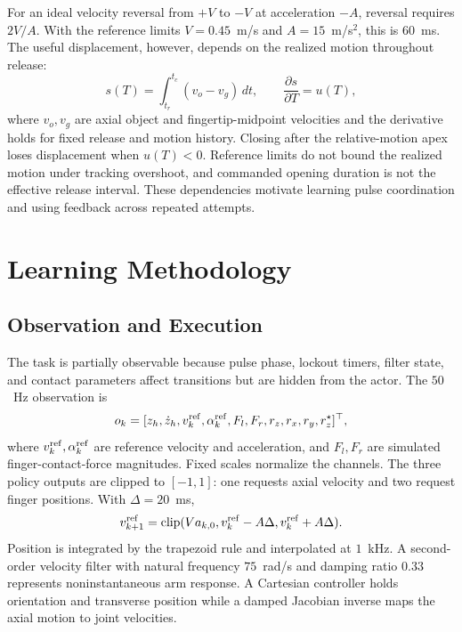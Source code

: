 \documentclass[letterpaper,10pt,conference]{ieeeconf}
\newcommand{\clip}{\operatorname{clip}}
\begin{document}
For an ideal velocity reversal from $+V$ to $-V$ at acceleration $-A$, reversal requires $2V/A$. With the reference limits $V=0.45$~m/s and $A=15$~m/s$^2$, this is $60$~ms. The useful displacement, however, depends on the realized motion throughout release:
\begin{equation}
 s(T)=\int_{t_r}^{t_c}(v_o-v_g)\,dt,\qquad
 \frac{\partial s}{\partial T}=u(T),
 \label{eq:slip}
\end{equation}
where $v_o,v_g$ are axial object and fingertip-midpoint velocities and the derivative holds for fixed release and motion history. Closing after the relative-motion apex loses displacement when $u(T)<0$. Reference limits do not bound the realized motion under tracking overshoot, and commanded opening duration is not the effective release interval. These dependencies motivate learning pulse coordination and using feedback across repeated attempts.

\section{Learning Methodology}
\subsection{Observation and Execution}
The task is partially observable because pulse phase, lockout timers, filter state, and contact parameters affect transitions but are hidden from the actor. The $50$~Hz observation is
\begin{equation}
 o_k=[z_h,\dot z_h,v_k^{\rm ref},\alpha_k^{\rm ref},F_l,F_r,
 r_z,r_x,r_y,r_z^\star]^\top,
\end{equation}
where $v_k^{\rm ref},\alpha_k^{\rm ref}$ are reference velocity and acceleration, and $F_l,F_r$ are simulated finger-contact-force magnitudes. Fixed scales normalize the channels. The three policy outputs are clipped to $[-1,1]$: one requests axial velocity and two request finger positions. With $\Delta=20$~ms,
\begin{equation}
 v_{k+1}^{\rm ref}=\clip(Va_{k,0},v_k^{\rm ref}-A\Delta,v_k^{\rm ref}+A\Delta).
\end{equation}
Position is integrated by the trapezoid rule and interpolated at $1$~kHz. A second-order velocity filter with natural frequency $75$~rad/s and damping ratio $0.33$ represents noninstantaneous arm response. A Cartesian controller holds orientation and transverse position while a damped Jacobian inverse maps the axial motion to joint velocities.
\end{document}
